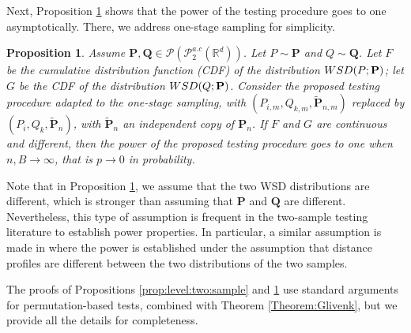 \documentclass{imsart}
\newtheorem {Proposition}{Proposition}[section]
\numberwithin{equation}{section}
\def\R{\mathbb{R}}
\begin{document}

Next, Proposition \ref{testing_power} shows that the power of the testing procedure goes to one asymptotically.
There, we address one-stage sampling for simplicity. 
\begin{Proposition}\label{testing_power}
	Assume $\mathbf{P}, \mathbf{Q} \in \mathcal{P}(\mathcal{P}_2^{a.c}(\R^d))$. 
	Let $P \sim \mathbf{P}$ and $Q \sim \mathbf{Q}$.
	Let $F$ be the 
	cumulative distribution function
	(CDF) of the distribution $\rm{WSD}(P; \mathbf{P})$; let $G$ be the CDF of the distribution $\rm{WSD}(Q; \mathbf{P})$. 
	Consider the proposed testing procedure adapted to the one-stage sampling, with $(P_{i,m},Q_{k,m},\widetilde{\mathbf{P}}_{n,m})$ replaced by 
	$(P_{i},Q_{k},\widetilde{\mathbf{P}}_{n})$,
	with $\widetilde{\mathbf{P}}_{n}$ an independent copy of $\mathbf{P}_{n}$.
	If $F$ and $G$ are continuous and different, then
	the power of the proposed testing procedure goes to one when $n,B\rightarrow\infty$, that is $ p \to 0$ in probability.
\end{Proposition}

Note that in Proposition \ref{testing_power}, we assume that the two WSD distributions are different, which is stronger than assuming that $\mathbf{P}$ and $ \mathbf{Q} $ are different. 
Nevertheless, this type of assumption is frequent in the two-sample testing literature to establish power properties. In particular, a similar assumption is made in \cite{dubey2024metric} where the power is established under the assumption that distance profiles are different between the two distributions of the two samples.

The proofs of Propositions \ref{prop:level:two:sample} and \ref{testing_power} use standard arguments for permutation-based tests,
combined with Theorem \ref{Theorem:Glivenk},
but we provide all the details for completeness. 
\end{document}
